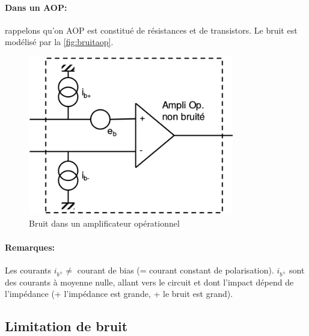 \paragraph{Dans un AOP:} rappelons qu'on AOP est constitué de résistances et de transistors. Le bruit est modélisé par la \autoref{fig:bruitaop}.
\begin{figure}[H] 
	\centering 
	\includegraphics[width=0.8\textwidth,height=10\baselineskip,keepaspectratio]{ch3/image3} 
	\caption{Bruit dans un amplificateur opérationnel} 
	\label{fig:bruitaop}
\end{figure}
\paragraph{Remarques:} Les courants \(i_{b^\pm} \neq\) courant de bias (= courant constant de polarisation). \(i_{b^\pm}\) sont des courants à moyenne nulle, allant vers le circuit et dont l'impact dépend de l'impédance (+ l'impédance est grande, + le bruit est grand).
\subsection{Limitation de bruit}
